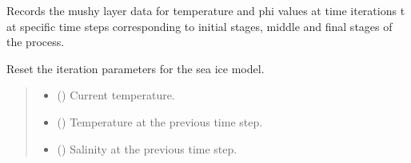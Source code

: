 \documentclass[a4paper,11pt,english,openany]{sphinxmanual}
\begin{document}
\begin{fulllineitems}
\begin{fulllineitems}
\label{\detokenize{api/spyice.models.sea_ice_model:src.spyice.models.sea_ice_model.SeaIceModel.record_mushy_layer_data}}
\pysigstartsignatures
\pysiglinewithargsret
{}
{\sphinxparamcomma {}\sphinxparamcomma {}\sphinxparamcomma {}\sphinxparamcomma {}\sphinxparamcomma {}}
{}
\pysigstopsignatures
\sphinxAtStartPar
Records the mushy layer data for temperature and phi values at time iterations t at specific time steps corresponding to initial stages, middle and final stages of the process.

\end{fulllineitems}


\begin{fulllineitems}
\label{\detokenize{api/spyice.models.sea_ice_model:src.spyice.models.sea_ice_model.SeaIceModel.reset_iteration_parameters}}
\pysigstartsignatures
\pysiglinewithargsret
{}
{\sphinxparamcomma {}\sphinxparamcomma {}\sphinxparamcomma {}}
{}
\pysigstopsignatures
\sphinxAtStartPar
Reset the iteration parameters for the sea ice model.
\begin{quote}\begin{description}
\begin{itemize}
\item {} 
\sphinxAtStartPar
{} () \textendash{} Current temperature.

\item {} 
\sphinxAtStartPar
{} () \textendash{} Temperature at the previous time step.

\item {} 
\sphinxAtStartPar
{} () \textendash{} Salinity at the previous time step.


\end{itemize}
\end{description}
\end{quote}
\end{fulllineitems}
\end{fulllineitems}
\end{document}

